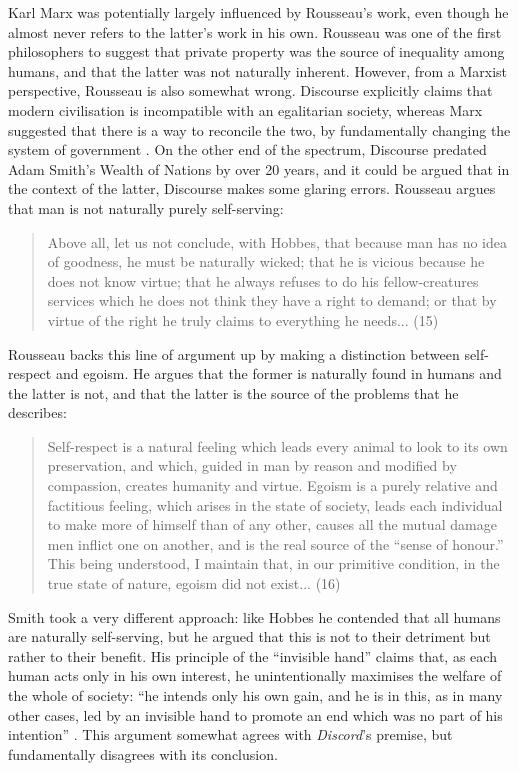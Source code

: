 Karl Marx was potentially largely influenced by Rousseau's work, even though he almost never refers to the latter's work in his own. Rousseau was one of the first philosophers to suggest that private property was the source of inequality among humans, and that the latter was not naturally inherent. However, from a Marxist perspective, Rousseau is also somewhat wrong. Discourse explicitly claims that modern civilisation is incompatible with an egalitarian society, whereas Marx suggested that there is a way to reconcile the two, by fundamentally changing the system of government \cite{marx}. On the other end of the spectrum, Discourse predated Adam Smith's Wealth of Nations by over 20 years, and it could be argued that in the context of the latter, Discourse makes some glaring errors. Rousseau argues that man is not naturally purely self-serving:

\begin{quote}
  Above all, let us not conclude, with Hobbes, that because man has no idea of goodness, he must be naturally wicked; that he is vicious because he does not know virtue; that he always refuses to do his fellow-creatures services which he does not think they have a right to demand; or that by virtue of the right he truly claims to everything he needs... (15)
\end{quote}

Rousseau backs this line of argument up by making a distinction between self-respect and egoism. He argues that the former is naturally found in humans and the latter is not, and that the latter is the source of the problems that he describes:

\begin{quote}
  Self-respect is a natural feeling which leads every animal to look to its own preservation, and which, guided in man by reason and modified by compassion, creates humanity and virtue. Egoism is a purely relative and factitious feeling, which arises in the state of society, leads each individual to make more of himself than of any other, causes all the mutual damage men inflict one on another, and is the real source of the ``sense of honour.'' This being understood, I maintain that, in our primitive condition, in the true state of nature, egoism did not exist... (16)
\end{quote}

Smith took a very different approach: like Hobbes he contended that all humans are naturally self-serving, but he argued that this is not to their detriment but rather to their benefit. His principle of the ``invisible hand'' claims that, as each human acts only in his own interest, he unintentionally maximises the welfare of the whole of society: ``he intends only his own gain, and he is in this, as in many other cases, led by an invisible hand to promote an end which was no part of his intention'' \cite{smith}. This argument somewhat agrees with \textit{Discord}'s premise, but fundamentally disagrees with its conclusion.

